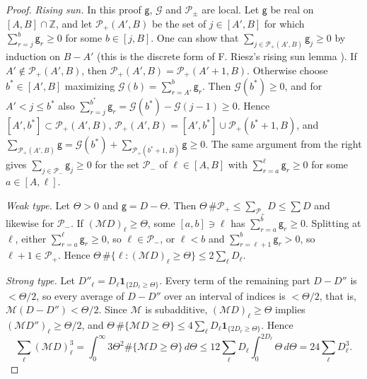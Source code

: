 \documentclass[11pt,a4paper]{article}
\makeatletter
\numberwithin{equation}{section}
\DeclareRobustCommand{\CGcite}[2][]{\if\relax\detokenize{#1}\relax\cite{#2}\else\cite[#1]{#2}\fi}
\newcommand{\CG@getbib}[1]{\@ifundefined{CGBib@#1}{#1}{\csname CGBib@#1\endcsname}}
\DeclareRobustCommand{\CGcite}[2][]{\pdftooltip{\if\relax\detokenize{#1}\relax\cite{#2}\else\cite[#1]{#2}\fi}{\CG@getbib{#2}}}
\theoremstyle{definition}
\theoremstyle{remark}
\newcommand{\M}{\mathcal M}
\newcommand{\Ind}{\mathbf 1}
\newcommand{\Z}{\mathbb Z}
\makeatother
\begin{document}
\begin{proof}
\emph{Rising sun.} In this proof $\mathsf g$, $\mathcal G$ and $\mathcal P_\pm$ are local. Let $\mathsf g$ be real on $[A,B]\cap\Z$, and let $\mathcal P_+(A',B)$ be the set of $j\in[A',B]$ for which $\sum_{r=j}^b\mathsf g_r\ge0$ for some $b\in[j,B]$. One can show that $\sum_{j\in \mathcal P_+(A',B)}\mathsf g_j\ge0$ by induction on $B-A'$ (this is the discrete form of F. Riesz's rising sun lemma \CGcite{Riesz1932}). If $A'\notin \mathcal P_+(A',B)$, then $\mathcal P_+(A',B)=\mathcal P_+(A'+1,B)$. Otherwise choose $b^*\in[A',B]$ maximizing $\mathcal G(b)=\sum_{r=A'}^b\mathsf g_r$. Then $\mathcal G(b^*)\ge0$, and for $A'<j\le b^*$ also $\sum_{r=j}^{b^*}\mathsf g_r=\mathcal G(b^*)-\mathcal G(j-1)\ge0$. Hence $[A',b^*]\subset \mathcal P_+(A',B)$, $\mathcal P_+(A',B)=[A',b^*]\cup \mathcal P_+(b^*+1,B)$, and $\sum_{\mathcal P_+(A',B)}\mathsf g=\mathcal G(b^*)+\sum_{\mathcal P_+(b^*+1,B)}\mathsf g\ge0$. The same argument from the right gives $\sum_{j\in\mathcal P_-}\mathsf g_j\ge0$ for the set $\mathcal P_-$ of $\ell\in[A,B]$ with $\sum_{r=a}^\ell \mathsf g_r\ge0$ for some $a\in[A,\ell]$.

\emph{Weak type.} Let $\Theta>0$ and $\mathsf g=D-\Theta$. Then $\Theta\,\#\mathcal P_+\le\sum_{\mathcal P_+}D\le\sum D$ and likewise for $\mathcal P_-$. If $(\M D)_\ell\ge\Theta$, some $[a,b]\ni\ell$ has $\sum_{r=a}^b\mathsf g_r\ge0$. Splitting at $\ell$, either $\sum_{r=a}^{\ell}\mathsf g_r\ge0$, so $\ell\in\mathcal P_-$, or $\ell<b$ and $\sum_{r=\ell+1}^b\mathsf g_r>0$, so $\ell+1\in\mathcal P_+$. Hence $\Theta\,\#\{\ell:(\M D)_\ell\ge\Theta\}\le2\sum_\ell D_\ell$.

\emph{Strong type.} Let $D''_\ell=D_\ell\Ind_{\{2D_\ell\ge\Theta\}}$. Every term of the remaining part $D-D''$ is $<\Theta/2$, so every average of $D-D''$ over an interval of indices is $<\Theta/2$, that is, $\M(D-D'')<\Theta/2$. Since $\M$ is subadditive, $(\M D)_\ell\ge\Theta$ implies $(\M D'')_\ell\ge\Theta/2$, and $\Theta\,\#\{\M D\ge\Theta\}\le4\sum_\ell D_\ell\Ind_{\{2D_\ell\ge\Theta\}}$. Hence
\begin{equation}
\sum_\ell(\M D)_\ell^3=\int_0^\infty3\Theta^2\#\{\M D\ge\Theta\}\,d\Theta\le12\sum_\ell D_\ell\int_0^{2D_\ell}\Theta\,d\Theta=24\sum_\ell D_\ell^3 .
\label{eq:disp_20}
\end{equation}
\end{proof}
\end{document}
